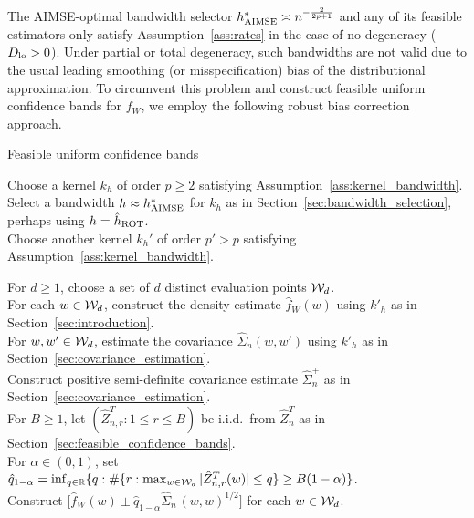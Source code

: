 The AIMSE-optimal bandwidth selector $h^*_{\operatorname{AIMSE}}\asymp n^{-\frac{2}{2p+1}}$
and any of its feasible estimators only satisfy Assumption~\ref{ass:rates} in
the case of no degeneracy ($D_{\textup{lo}}>0$). Under partial or total degeneracy, such
bandwidths are not valid due to the usual leading smoothing (or
misspecification) bias of the distributional approximation. To circumvent this
problem and construct feasible uniform confidence bands for $f_W$, we employ
the following robust bias correction approach.

\begin{algorithm}[t]
  \caption{Feasible uniform confidence bands}
  \label{alg:method}

  Choose a kernel $k_h$ of order $p \geq 2$ satisfying
  Assumption~\ref{ass:kernel_bandwidth}. \\

  Select a bandwidth $h \approx h^*_{\operatorname{AIMSE}}$ for $k_h$
  as in Section~\ref{sec:bandwidth_selection},
  perhaps using $h = \hat{h}_{\operatorname{ROT}}$. \\

  Choose another kernel $k_h'$ of order $p'>p$ satisfying
  Assumption~\ref{ass:kernel_bandwidth}.

  For $d \geq 1$, choose a set of $d$ distinct evaluation points $\mathcal{W}_d$. \\

  For each $w \in \mathcal{W}_d$, construct the density estimate $\hat f_W(w)$
  using $k'_{h}$ as in Section~\ref{sec:introduction}. \\

  For $w, w' \in \mathcal{W}_d$, estimate the covariance $\hat \Sigma_n(w,w')$
  using $k'_{h}$ as in Section~\ref{sec:covariance_estimation}. \\

  Construct positive semi-definite
  covariance estimate $\hat \Sigma_n^+$
  as in Section~\ref{sec:covariance_estimation}. \\

  For $B \geq 1$, let $(\hat Z_{n,r}^T: 1\leq r\leq B)$ be i.i.d.\
  from $\hat{Z}_n^T$ as in Section~\ref{sec:feasible_confidence_bands}. \\

  For $\alpha \in (0,1)$, set
  $\hat q_{1-\alpha} = \inf_{q \in \mathbb{R}}
  \{ q : \# \{r: \max_{w\in\mathcal{W}_d}|\hat Z_{n,r}^T(w)| \leq q \}
  \geq B(1-\alpha) \}$. \\

  Construct $ \big[\hat f_W(w) \pm
  \hat q_{1-\alpha} \hat\Sigma_n^+(w,w)^{1/2} \big]$ for each $w \in \mathcal{W}_d$.
\end{algorithm}

